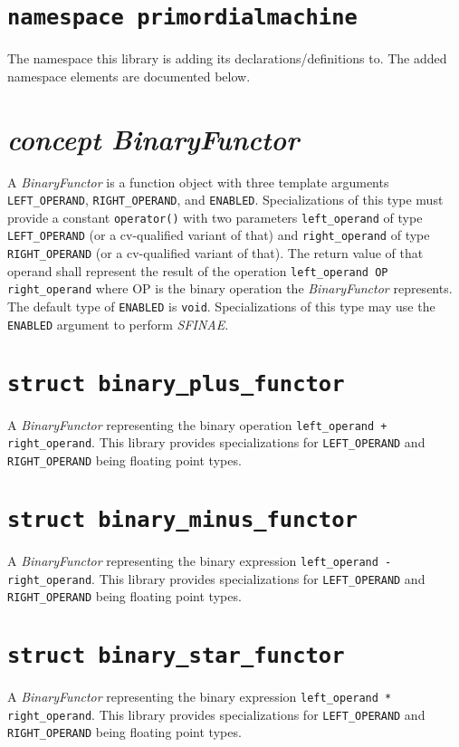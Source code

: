 \documentclass[oneside]{book}
\begin{document}
\section{\texttt{namespace primordialmachine}}
The namespace this library is adding its declarations/definitions to.
The added namespace elements are documented below.

\section{\textit{concept BinaryFunctor}}
A \textit{BinaryFunctor} is a function object with three template arguments \verb+LEFT_OPERAND+,
\verb+RIGHT_OPERAND+, and \verb+ENABLED+. Specializations of this type must provide a
constant \verb+operator()+ with two parameters \verb+left_operand+ of type \verb+LEFT_OPERAND+
(or a cv-qualified variant of that) and \verb+right_operand+ of type \verb+RIGHT_OPERAND+
(or a cv-qualified variant of that). The return value of that operand shall represent the
result of the operation \verb+left_operand OP right_operand+ where OP is the binary operation
the \textit{BinaryFunctor} represents.\\

\noindent{}The default type of \verb+ENABLED+ is \verb+void+. Specializations of this type may use
the \verb+ENABLED+ argument to perform \textit{SFINAE}.

\section{\texttt{struct binary\_plus\_functor}}
A \textit{BinaryFunctor} representing the binary operation \verb|left_operand + right_operand|.
This library provides specializations for \texttt{LEFT\_OPERAND} and \texttt{RIGHT\_OPERAND} being floating point types.

\section{\texttt{struct binary\_minus\_functor}}
A \textit{BinaryFunctor} representing the binary expression \verb|left_operand - right_operand|.
This library provides specializations for \texttt{LEFT\_OPERAND} and \texttt{RIGHT\_OPERAND} being floating point types.

\section{\texttt{struct binary\_star\_functor}}
A \textit{BinaryFunctor} representing the binary expression \verb|left_operand * right_operand|.
This library provides specializations for \texttt{LEFT\_OPERAND} and \texttt{RIGHT\_OPERAND} being floating point types.
\end{document}
